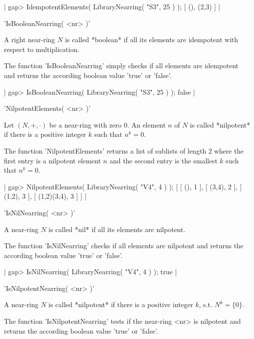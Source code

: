 |  gap> IdempotentElements( LibraryNearring( "S3", 25 ) );      
  [ (), (2,3) ]
|

   
'IsBooleanNearring( <nr> )'  

A right near-ring $N$ is called *boolean* if all its elements are
idempotent with respect to multiplication.

The function 'IsBooleanNearring' simply checks if all elements
are idempotent and returns the according boolean value 
'true' or 'false'.

|  gap> IsBooleanNearring( LibraryNearring( "S3", 25 ) ); 
  false
|

   
'NilpotentElements( <nr> )'  

Let $(N,+,\cdot)$ be a near-ring with zero $0$. An element $n$ of $N$ is 
called *nilpotent* if there is a positive integer $k$ such that
$n^k = 0$.

The function 'NilpotentElements' returns a list of sublists of length 
$2$ where the first entry is a nilpotent element $n$ and the second
entry is the smallest $k$ such that $n^k = 0$.

|  gap> NilpotentElements( LibraryNearring( "V4", 4 ) ); 
  [ [ (), 1 ], [ (3,4), 2 ], [ (1,2), 3 ], [ (1,2)(3,4), 3 ] ]
|

   
'IsNilNearring( <nr> )'  

A near-ring $N$ is called *nil* if all its elements are
nilpotent.

The function 'IsNilNearring' checks if all elements
are nilpotent and returns the according boolean value 
'true' or 'false'.

|  gap> IsNilNearring( LibraryNearring( "V4", 4 ) );    
  true
|

   
'IsNilpotentNearring( <nr> )'  

A near-ring $N$ is called *nilpotent* if there is a positive integer
$k$, s.t. $N^k = \{0\}$.

The function 'IsNilpotentNearring' tests if
the near-ring <nr> is nilpotent and returns the according boolean value 
'true' or 'false'.

